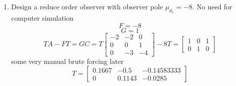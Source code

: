 \begin{enumerate}
  \item Design a reduce order observer with observer pole $\mu_{d_1} = -8$. No need for computer simulation\\
    \begin{equation}
      F = -8
    \end{equation}
    \begin{equation}
      G = 1
    \end{equation}
    \begin{equation}
      TA - FT = GC =
      T
      \begin{bmatrix}
        -2 & -2 & 0 \\
        0 & 0 & 1 \\
        0 & -3 & -4 
      \end{bmatrix}
      - 8T = 
      \begin{bmatrix}
        1 & 0 & 1 \\
        0 & 1 & 0
      \end{bmatrix}
    \end{equation}
    some very manual brute forcing later
    \begin{equation}
      T =
      \begin{bmatrix}
        0.1667 & -0.5 & -0.14583333 \\
        0 & 0.1143 & -0.0285
      \end{bmatrix}
    \end{equation}
  \end{enumerate}
  